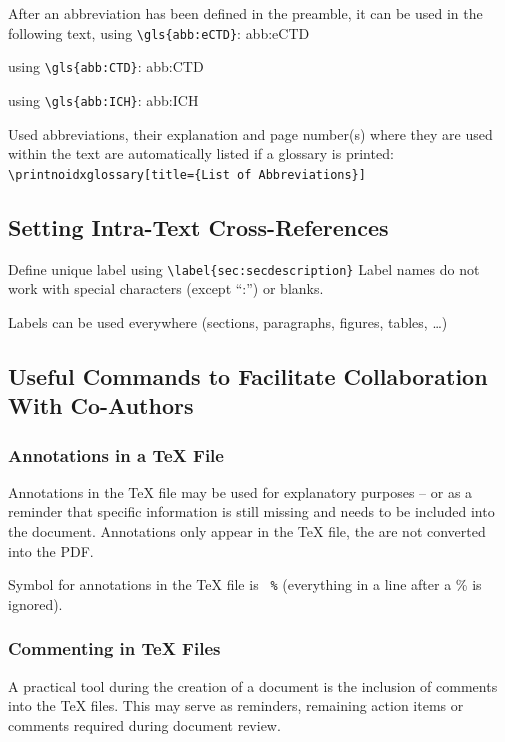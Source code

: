 After an abbreviation has been defined in the preamble, it can be used in the following text, \eg
using \verb|\gls{abb:eCTD}|: \gls{abb:eCTD}

using \verb|\gls{abb:CTD}|: \gls{abb:CTD}

using \verb|\gls{abb:ICH}|: \gls{abb:ICH}

Used abbreviations, their explanation and page number(s) where they are used within the text are
automatically listed if a glossary is printed:\\
\verb|\printnoidxglossary[title={List of Abbreviations}]|


\subsection{Setting Intra-Text Cross-References}
Define unique label using\newline
\verb|\label{sec:secdescription}|\newline
Label names do not work with special characters (except \enquote{:}) or blanks.

Labels can be used everywhere (sections, paragraphs, figures, tables, \dots)

\subsection{Useful Commands to Facilitate Collaboration With Co-Authors}
\subsubsection{Annotations in a \TeX{} File}
Annotations in the \TeX{} file may be used for explanatory purposes -- or as a reminder that specific
information is still missing and needs to be included into the document.
Annotations only appear in the \TeX{} file, the are not converted into the PDF.

Symbol for annotations in the \TeX{} file is \verb| %| (everything in a line after a \% is ignored).

\subsubsection{Commenting in \TeX{} Files}
A practical tool during the creation of a document is the inclusion of comments into the \TeX{} files. This
may serve as reminders, remaining action items or comments required during document review.

